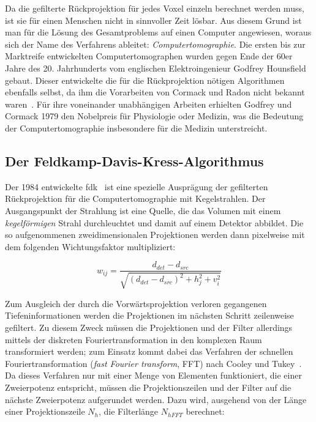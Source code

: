 Da die gefilterte Rückprojektion für jedes Voxel einzeln berechnet werden muss, ist sie für einen Menschen nicht in
sinnvoller Zeit lösbar. Aus diesem Grund ist man für die Lösung des Gesamtproblems auf einen Computer angewiesen, woraus
sich der Name des Verfahrens ableitet: \textit{Computertomographie}. Die ersten bis zur Marktreife entwickelten
Computertomographen wurden gegen Ende der 60er Jahre des 20. Jahrhunderts vom englischen Elektroingenieur Godfrey
Hounsfield gebaut. Dieser entwickelte die für die Rückprojektion nötigen Algorithmen ebenfalls selbst, da ihm die
Vorarbeiten von Cormack und Radon nicht bekannt waren~\cite{kalender}. Für ihre voneinander unabhängigen Arbeiten
erhielten Godfrey und Cormack 1979 den Nobelpreis für Physiologie oder Medizin, was die Bedeutung der
Computertomographie insbesondere für die Medizin unterstreicht.

\subsection{Der Feldkamp-Davis-Kress-Algorithmus}

Der 1984 entwickelte \gls{fdk}~\cite{fdk} ist eine spezielle Ausprägung der gefilterten Rückprojektion für die
Computertomographie mit Kegelstrahlen. Der Ausgangspunkt der Strahlung ist eine Quelle, die das Volumen mit einem
\textit{kegelförmigen} Strahl durchleuchtet und damit auf einem Detektor abbildet. Die so aufgenommenen
zweidimensionalen Projektionen werden dann pixelweise mit dem folgenden Wichtungsfaktor multipliziert:

\begin{equation}
    w_{ij} = \frac{d_{det} - d_{src}}{\sqrt{(d_{det} - d_{src})^2 + h_j^2 + v_i^2}}
\end{equation}

Zum Ausgleich der durch die Vorwärtsprojektion verloren gegangenen Tiefeninformationen werden die Projektionen im
nächsten Schritt zeilenweise gefiltert. Zu diesem Zweck müssen die Projektionen und der Filter allerdings mittels der
diskreten Fouriertransformation in den komplexen Raum transformiert werden; zum Einsatz kommt dabei das Verfahren der
schnellen Fouriertransformation (\textit{fast Fourier transform}, FFT) nach Cooley und Tukey~\cite{cooltuk}. Da dieses
Verfahren nur mit einer Menge von Elementen funktioniert, die einer Zweierpotenz entspricht, müssen die
Projektionszeilen und der Filter auf die nächste Zweierpotenz {\glqq}aufgerundet{\grqq} werden. Dazu wird, ausgehend von
der Länge einer Projektionszeile $N_h$,  die Filterlänge $N_{hFFT}$ berechnet:

